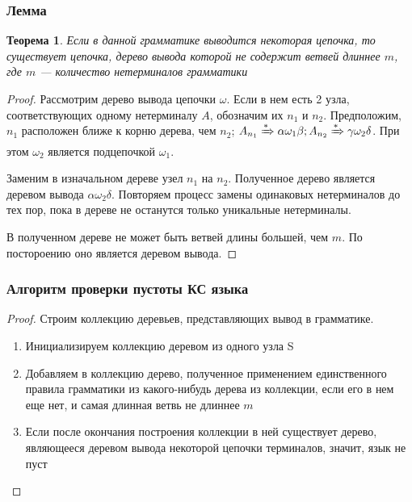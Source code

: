 \documentclass{beamer}
\newtheorem{rutheorem}{Теорема}
\begin{document}
\begin{frame}[fragile]
  \transwipe[direction=90]
  \frametitle{Лемма}
   \begin{rutheorem}
   Если в данной грамматике выводится некоторая цепочка, то существует цепочка, дерево вывода которой не содержит ветвей длиннее $m$, где $m$ --- количество нетерминалов грамматики
   \end{rutheorem}
   \begin{proof}
   Рассмотрим дерево вывода цепочки $\omega$. Если в нем есть 2 узла, соответствующих одному нетерминалу $A$, обозначим их $n_1$ и $n_2$. Предположим, $n_1$ расположен ближе к корню дерева, чем $n_2$; $A_{n_1} \xRightarrow[]{*} \alpha \omega_1 \beta; A_{n_2} \xRightarrow[]{*} \gamma \omega_2 \delta$. При этом $\omega_2$ является подцепочкой $\omega_1$. 
   
   Заменим в изначальном дереве узел $n_1$ на $n_2$. Полученное дерево является деревом вывода $\alpha \omega_2 \delta$. Повторяем процесс замены одинаковых нетерминалов до тех пор, пока в дереве не останутся только уникальные нетерминалы. 
   
   В полученном дереве не может быть ветвей длины большей, чем $m$. По постороению оно является деревом вывода. 
   \end{proof}
\end{frame}

\begin{frame}[fragile]
  \transwipe[direction=90]
  \frametitle{Алгоритм проверки пустоты КС языка}
   \begin{proof}
   Строим коллекцию деревьев, представляющих вывод в грамматике.
   
  \begin{enumerate}
    \item Инициализируем коллекцию деревом из одного узла S
    \item Добавляем в коллекцию дерево, полученное применением единственного правила грамматики из какого-нибудь дерева из коллекции, если его в нем еще нет, и самая длинная ветвь не длиннее $m$
    \item Если после окончания построения коллекции в ней существует дерево, являющееся деревом вывода некоторой цепочки терминалов, значит, язык не пуст
  \end{enumerate}
   \end{proof}
\end{frame}



 
\end{document}
